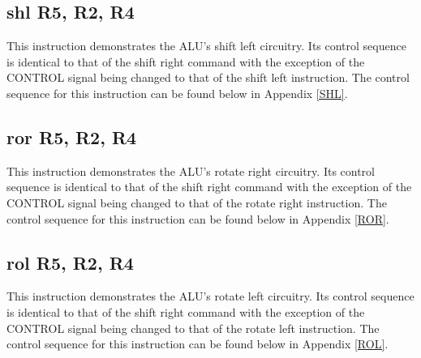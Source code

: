 \documentclass{article}
\begin{document}

    \subsection{shl R5, R2, R4}
    This instruction demonstrates the ALU's shift left circuitry. Its control sequence is identical to that of the shift right command with the exception of the CONTROL signal being changed to that of the shift left instruction. The control sequence for this instruction can be found below in Appendix \ref{SHL}.


    \subsection{ror R5, R2, R4}
    This instruction demonstrates the ALU's rotate right circuitry. Its control sequence is identical to that of the shift right command with the exception of the CONTROL signal being changed to that of the rotate right instruction. The control sequence for this instruction can be found below in Appendix \ref{ROR}.


    \subsection{rol R5, R2, R4}
    This instruction demonstrates the ALU's rotate left circuitry. Its control sequence is identical to that of the shift right command with the exception of the CONTROL signal being changed to that of the rotate left instruction. The control sequence for this instruction can be found below in Appendix \ref{ROL}.
\end{document}
